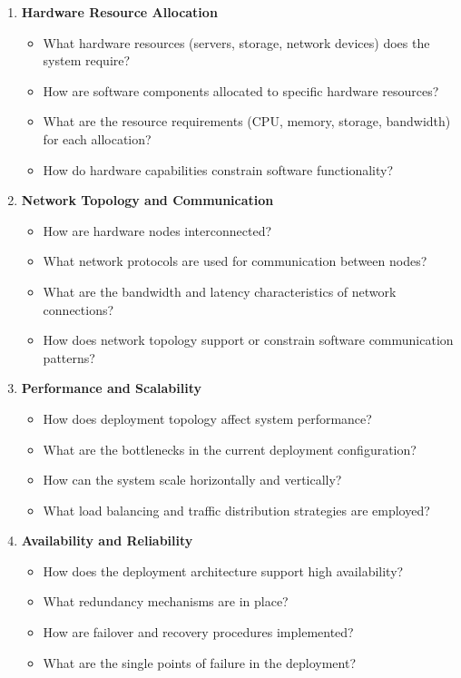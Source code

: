 \documentclass[11pt,letterpaper]{article}
\begin{document}
\begin{enumerate}[label=\textbf{C\arabic*:}, leftmargin=2.5em]
    \item \textbf{Hardware Resource Allocation}
    \begin{itemize}[nosep]
        \item What hardware resources (servers, storage, network devices) does the system require?
        \item How are software components allocated to specific hardware resources?
        \item What are the resource requirements (CPU, memory, storage, bandwidth) for each allocation?
        \item How do hardware capabilities constrain software functionality?
    \end{itemize}
    
    \item \textbf{Network Topology and Communication}
    \begin{itemize}[nosep]
        \item How are hardware nodes interconnected?
        \item What network protocols are used for communication between nodes?
        \item What are the bandwidth and latency characteristics of network connections?
        \item How does network topology support or constrain software communication patterns?
    \end{itemize}
    
    \item \textbf{Performance and Scalability}
    \begin{itemize}[nosep]
        \item How does deployment topology affect system performance?
        \item What are the bottlenecks in the current deployment configuration?
        \item How can the system scale horizontally and vertically?
        \item What load balancing and traffic distribution strategies are employed?
    \end{itemize}
    
    \item \textbf{Availability and Reliability}
    \begin{itemize}[nosep]
        \item How does the deployment architecture support high availability?
        \item What redundancy mechanisms are in place?
        \item How are failover and recovery procedures implemented?
        \item What are the single points of failure in the deployment?
    \end{itemize}
    

\end{enumerate}
\end{document}
